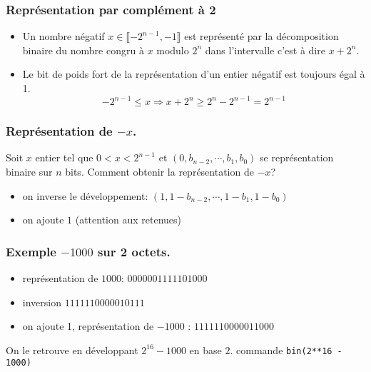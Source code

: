 \begin{frame}
  \frametitle{Représentation par complément à 2}
\begin{itemize}
  \item Un nombre négatif $x\in \llbracket -2^{n-1}, -1 \rrbracket$ est représenté par la décomposition binaire du nombre congru à $x$ modulo $2^{n}$ dans l'intervalle c'est à dire $x + 2^n$.
  \item Le bit de poids fort de la représentation d'un entier négatif est toujours égal à 1. 
\begin{displaymath}
  -2^{n-1} \leq x \Rightarrow x + 2^n \geq 2^n - 2^{n-1} = 2^{n-1}
\end{displaymath}

\end{itemize}
\end{frame}

\begin{frame}
  \frametitle{Représentation de $-x$.}
Soit $x$ entier tel que $0<x<2^{n-1}$ et $(0,b_{n-2},\cdots,b_1,b_0)$ se représentation binaire sur $n$ bits.\newline
Comment obtenir la représentation de $-x$? 
\begin{itemize}
  \item on inverse le développement: $(1,1-b_{n-2},\cdots,1-b_1,1-b_0)$
  \item on ajoute $1$ (attention aux retenues)
\end{itemize}
\end{frame}

\begin{frame}
  \frametitle{Exemple $-1000$ sur 2 octets.}
\begin{itemize}
  \item représentation de $1000$: $0000001111101000$
  \item inversion $1111110000010111$
  \item on ajoute 1, représentation de $-1000$ : $1111110000011000$ 
\end{itemize}
On le retrouve en développant $2^{16}-1000$ en base $2$.\newline
commande \texttt{bin(2**16 - 1000)}  
\end{frame}


